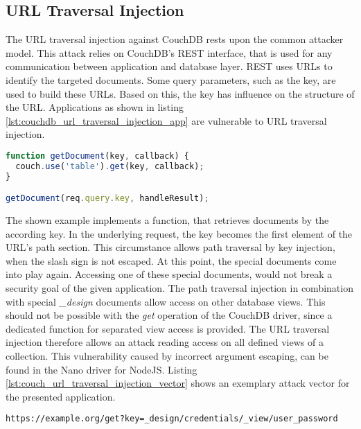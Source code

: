 \subsection{URL Traversal Injection}
The URL traversal injection against CouchDB rests upon the common attacker model. This attack relies on CouchDB's REST interface, that is used for any communication between application and database layer. REST uses URLs to identify the targeted documents. Some query parameters, such as the key, are used to build these URLs. Based on this, the key has influence on the structure of the URL. Applications as shown in listing \ref{lst:couchdb_url_traversal_injection_app} are vulnerable to URL traversal injection. \\

\begin{lstlisting}[caption={Vulnerable NodeJS example for URL traversal injection against CouchDB}, label={lst:couchdb_url_traversal_injection_app}, language=JavaScript]
function getDocument(key, callback) {
  couch.use('table').get(key, callback);
}

getDocument(req.query.key, handleResult);
\end{lstlisting}

The shown example implements a function, that retrieves documents by the according key. In the underlying request, the key becomes the first element of the URL's path section. This circumstance allows path traversal by key injection, when the slash sign is not escaped. At this point, the special documents come into play again. Accessing one of these special documents, would not break a security goal of the given application. The path traversal injection in combination with special \emph{\_design} documents allow access on other database views. This should not be possible with the \emph{get} operation of the CouchDB driver, since a dedicated function for separated view access is provided. The URL traversal injection therefore allows an attack reading access on all defined views of a collection. This vulnerability caused by incorrect argument escaping, can be found in the Nano driver for NodeJS. Listing \ref{lst:couch_url_traversal_injection_vector} shows an exemplary attack vector for the presented application. \\

\begin{lstlisting}[caption={Attack vector against CouchDB for URL traversal injection via the query-string parameter}, label={lst:couch_url_traversal_injection_vector}]
https://example.org/get?key=_design/credentials/_view/user_password
\end{lstlisting}

